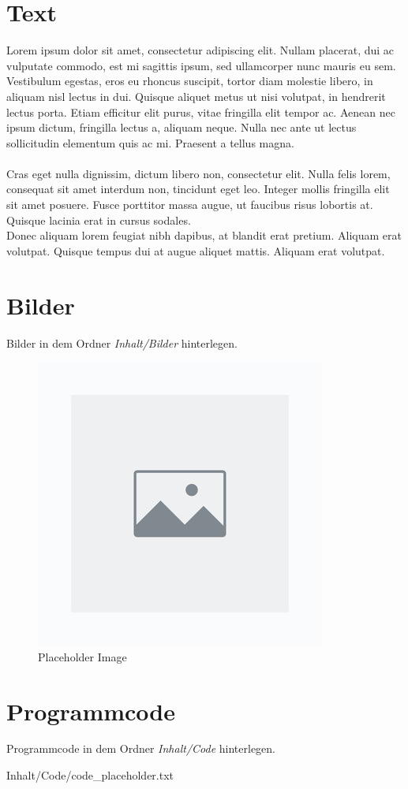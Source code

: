 \section{Text}
\label{sec:Text}
%
Lorem ipsum dolor sit amet, consectetur adipiscing elit. Nullam placerat, dui ac vulputate commodo, est mi sagittis ipsum, sed ullamcorper nunc mauris eu sem. Vestibulum egestas, eros eu rhoncus suscipit, tortor diam molestie libero, in aliquam nisl lectus in dui. Quisque aliquet metus ut nisi volutpat, in hendrerit lectus porta. Etiam efficitur elit purus, vitae fringilla elit tempor ac. Aenean nec ipsum dictum, fringilla lectus a, aliquam neque. Nulla nec ante ut lectus sollicitudin elementum quis ac mi. Praesent a tellus magna.\\\\
%
Cras eget nulla dignissim, dictum libero non, consectetur elit. Nulla felis lorem, consequat sit amet interdum non, tincidunt eget leo. Integer mollis fringilla elit sit amet posuere. Fusce porttitor massa augue, ut faucibus risus lobortis at. Quisque lacinia erat in cursus sodales. \\
Donec aliquam lorem feugiat nibh dapibus, at blandit erat pretium. Aliquam erat volutpat. Quisque tempus dui at augue aliquet mattis. Aliquam erat volutpat.
%
%
\section{Bilder}
\label{sec:Bilder}
%
Bilder in dem Ordner \textit{Inhalt/Bilder} hinterlegen.
%
\begin{figure}[htpb]						
    \centering
    \includegraphics[width=.3\textwidth]{Inhalt/Bilder/placeholder_image.png}
    \caption{Placeholder Image}
    \label{fig:placeholder} 
\end{figure}
%
%
\section{Programmcode}
\label{sec:Programmcode}
%
Programmcode in dem Ordner \textit{Inhalt/Code} hinterlegen.
%

    {Inhalt/Code/code_placeholder.txt}
%
%
